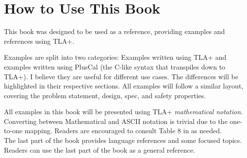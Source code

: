 \section{How to Use This Book}

This book was designed to be used as a reference, providing examples
and references using TLA+.\newline

Examples are split into two categories: Examples written using TLA+ and
examples written using PlusCal (the C-like syntax that transpiles down to TLA+).
I believe they are useful for different use cases. The differences will
be highlighted in their respective sections. All examples will follow a
similar layout, covering the problem statement, design, spec, and safety
properties.\newline

All examples in this book will be presented using TLA+ \textit{mathematical
notation}. Converting between Mathematical and ASCII notation is trivial due to
the one-to-one mapping. Readers are encouraged to consult Table 8 in \cite{ss}
as needed.\\

The last part of the book provides language references and some focused topics.
Readers can use the last part of the book as a general reference. 
